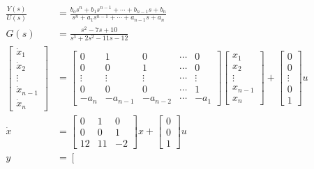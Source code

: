 \documentclass[main.tex]{subfiles}
\begin{document}
\begin{enumerate}
\begin{enumerate}
        $$
        \begin{aligned}
        \frac{Y(s)}{U(s)} &= \frac{b_o s^n+b_1 s^{n-1}+\cdots+b_{n-1} s+b_n}{s^n+a_1 s^{n-1}+\cdots+a_{n-1} s+a_n}\\
        G(s) &= \frac{s^2 - 7s + 10}{s^3+2 s^2-11 s-12}\\
        \left[\begin{array}{c}
        \dot{x}_1 \\
        \dot{x}_2 \\
        \vdots \\
        \dot{x}_{n-1} \\
        \dot{x}_n
        \end{array}\right] &= \left[\begin{array}{ccccc}
        0 & 1 & 0 & \cdots & 0 \\
        0 & 0 & 1 & \cdots & 0 \\
        \vdots & \vdots & \vdots & \cdots & \vdots \\
        0 & 0 & 0 & \cdots & 1 \\
        -a_n & -a_{n-1} & -a_{n-2} & \cdots & -a_1
        \end{array}\right]\left[\begin{array}{c}
        x_1 \\
        x_2 \\
        \vdots \\
        x_{n-1} \\
        x_n
        \end{array}\right]+\left[\begin{array}{c}
        0 \\
        0 \\
        \vdots \\
        0 \\
        1
        \end{array}\right] u\\
        \dot{x} &= \left[\begin{array}{ccc}
        0 & 1 & 0 \\
        0 & 0 & 1 \\
        12 & 11 & -2
        \end{array}\right] x + \left[\begin{array}{l}
        0 \\
        0 \\
        1
        \end{array}\right] u \\
        y &= \left[\begin{array}{lllll}

\end{array}
\end{aligned}$$
\end{enumerate}
\end{enumerate}
\end{document}
